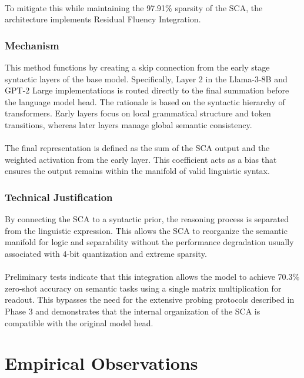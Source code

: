 \documentclass[11pt, letterpaper]{article}
\begin{document}
\paragraph{}
To mitigate this while maintaining the 97.91\% sparsity of the SCA, the architecture implements Residual Fluency Integration.

\subsubsection{Mechanism}
This method functions by creating a skip connection from the early stage syntactic layers of the base model. Specifically, Layer 2 in the Llama-3-8B and GPT-2 Large implementations is routed directly to the final summation before the language model head. The rationale is based on the syntactic hierarchy of transformers. Early layers focus on local grammatical structure and token transitions, whereas later layers manage global semantic consistency.

\paragraph{}
The final representation is defined as the sum of the SCA output and the weighted activation from the early layer. This coefficient acts as a bias that ensures the output remains within the manifold of valid linguistic syntax.

\subsubsection{Technical Justification}
By connecting the SCA to a syntactic prior, the reasoning process is separated from the linguistic expression. This allows the SCA to reorganize the semantic manifold for logic and separability without the performance degradation usually associated with 4-bit quantization and extreme sparsity.

\paragraph{}
Preliminary tests indicate that this integration allows the model to achieve 70.3\% zero-shot accuracy on semantic tasks using a single matrix multiplication for readout. This bypasses the need for the extensive probing protocols described in Phase 3 and demonstrates that the internal organization of the SCA is compatible with the original model head.

\section{Empirical Observations}
\begin{center}
\end{center}
\end{document}
